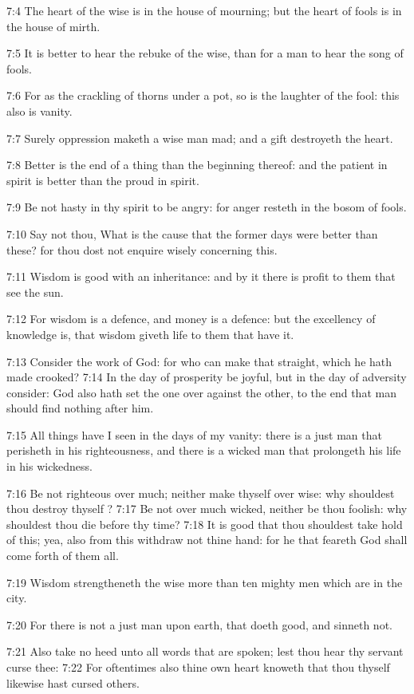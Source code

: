7:4 The heart of the wise is in the house of mourning; but the heart
of fools is in the house of mirth.

7:5 It is better to hear the rebuke of the wise, than for a man to
hear the song of fools.

7:6 For as the crackling of thorns under a pot, so is the laughter of
the fool: this also is vanity.

7:7 Surely oppression maketh a wise man mad; and a gift destroyeth the
heart.

7:8 Better is the end of a thing than the beginning thereof: and the
patient in spirit is better than the proud in spirit.

7:9 Be not hasty in thy spirit to be angry: for anger resteth in the
bosom of fools.

7:10 Say not thou, What is the cause that the former days were better
than these? for thou dost not enquire wisely concerning this.

7:11 Wisdom is good with an inheritance: and by it there is profit to
them that see the sun.

7:12 For wisdom is a defence, and money is a defence: but the
excellency of knowledge is, that wisdom giveth life to them that have
it.

7:13 Consider the work of God: for who can make that straight, which
he hath made crooked?  7:14 In the day of prosperity be joyful, but in
the day of adversity consider: God also hath set the one over against
the other, to the end that man should find nothing after him.

7:15 All things have I seen in the days of my vanity: there is a just
man that perisheth in his righteousness, and there is a wicked man
that prolongeth his life in his wickedness.

7:16 Be not righteous over much; neither make thyself over wise: why
shouldest thou destroy thyself ?  7:17 Be not over much wicked,
neither be thou foolish: why shouldest thou die before thy time?  7:18
It is good that thou shouldest take hold of this; yea, also from this
withdraw not thine hand: for he that feareth God shall come forth of
them all.

7:19 Wisdom strengtheneth the wise more than ten mighty men which are
in the city.

7:20 For there is not a just man upon earth, that doeth good, and
sinneth not.

7:21 Also take no heed unto all words that are spoken; lest thou hear
thy servant curse thee: 7:22 For oftentimes also thine own heart
knoweth that thou thyself likewise hast cursed others.

